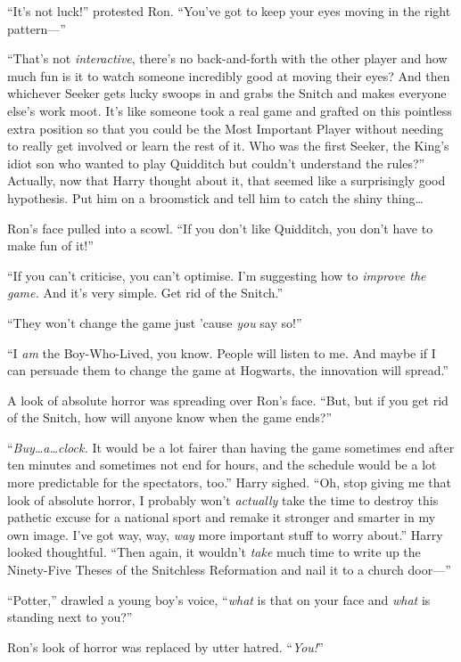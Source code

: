 “It’s not luck!” protested Ron. “You’ve got to keep your eyes moving in the right pattern—”

“That’s not \emph{interactive}, there’s no back-and-forth with the other player and how much fun is it to watch someone incredibly good at moving their eyes? And then whichever Seeker gets lucky swoops in and grabs the Snitch and makes everyone else’s work moot. It’s like someone took a real game and grafted on this pointless extra position so that you could be the Most Important Player without needing to really get involved or learn the rest of it. Who was the first Seeker, the King’s idiot son who wanted to play Quidditch but couldn’t understand the rules?” Actually, now that Harry thought about it, that seemed like a surprisingly good hypothesis. Put him on a broomstick and tell him to catch the shiny thing…

Ron’s face pulled into a scowl. “If you don’t like Quidditch, you don’t have to make fun of it!”

“If you can’t criticise, you can’t optimise. I’m suggesting how to \emph{improve the game.} And it’s very simple. Get rid of the Snitch.”

“They won’t change the game just ’cause \emph{you} say so!”

“I \emph{am} the Boy-Who-Lived, you know. People will listen to me. And maybe if I can persuade them to change the game at Hogwarts, the innovation will spread.”

A look of absolute horror was spreading over Ron’s face. “But, but if you get rid of the Snitch, how will anyone know when the game ends?”

“\emph{Buy…a…clock.} It would be a lot fairer than having the game sometimes end after ten minutes and sometimes not end for hours, and the schedule would be a lot more predictable for the spectators, too.” Harry sighed. “Oh, stop giving me that look of absolute horror, I probably won’t \emph{actually} take the time to destroy this pathetic excuse for a national sport and remake it stronger and smarter in my own image. I’ve got way, way, \emph{way} more important stuff to worry about.” Harry looked thoughtful. “Then again, it wouldn’t \emph{take} much time to write up the Ninety-Five Theses of the Snitchless Reformation and nail it to a church door—”

“Potter,” drawled a young boy’s voice, “\emph{what} is that on your face and \emph{what} is standing next to you?”

Ron’s look of horror was replaced by utter hatred. “\emph{You!}”

